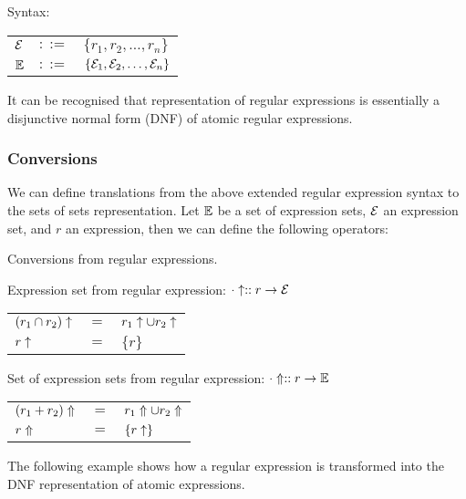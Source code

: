 \begin{defn}
   \label{defn-esets}
   Syntax:

   \begin{tabular}{lll}
      $\mathcal{E}$	& $::=$ & $\{r_1, r_2, \dots, r_n\}$ \\
      $\mathbb{E}$	& $::=$ & $\{\mathcal{E}_1, \mathcal{E}_2, \dots, \mathcal{E}_n\}$ \\
   \end{tabular}
\end{defn}

It can be recognised that representation of regular expressions is essentially a
disjunctive normal form (DNF) of atomic regular expressions.

\subsubsection{Conversions}

We can define translations from the above extended regular expression syntax to
the sets of sets representation. Let $\mathbb{E}$ be a set of expression sets,
$\mathcal{E}$ an expression set, and $r$ an expression, then we can define the
following operators:

\begin{defn}
   \label{defn-re2esets}
   Conversions from regular expressions.

   Expression set from regular expression:
   $\cdot\uparrow :: r \to \mathcal{E}$

   \begin{tabular}{lll}
      $(r_1 \cap r_2)\uparrow$	& $=$	& $r_1\uparrow \cup r_2\uparrow$	\\
      $r\uparrow$			& $=$	& $\{r\}$			\\
   \end{tabular}

   Set of expression sets from regular expression:
   $\cdot\Uparrow :: r \to \mathbb{E}$

   \begin{tabular}{lll}
      $(r_1 + r_2)\Uparrow$	& $=$	& $r_1\Uparrow \cup r_2\Uparrow$	\\
      $r\Uparrow$		& $=$	& $\{r\uparrow\}$			\\
   \end{tabular}
\end{defn}

The following example shows how a regular expression is transformed into the DNF
representation of atomic expressions.

